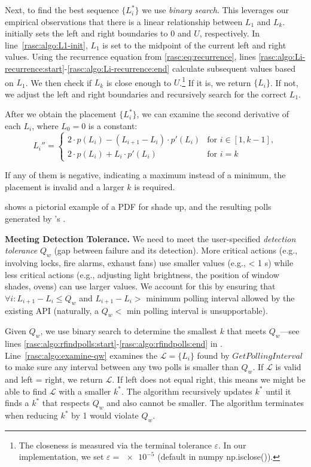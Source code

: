 Next, to find the best sequence $\{L_i^{\!*}\}$ 
we use {\it binary search}. This leverages our empirical observations that there is a linear relationship between $L_1$ and $L_k$. 
 initially sets the left and right boundaries to 0 and $U$, respectively. In line~\ref{rasc:algo:L1-init}, $L_1$ is set to the midpoint of the current left and right values. Using the recurrence equation from \eqref{rasc:eq:recurrence}, lines \ref{rasc:algo:Li-recurrence:start}-\ref{rasc:algo:Li-recurrence:end} calculate subsequent values based on $L_1$. We then check if $L_k$ is close enough to $U$.\footnote{The closeness is measured via the 
terminal tolerance $\varepsilon$. 
In our implementation, we set $\varepsilon=\num{e-5}$ (default in numpy np.isclose()).} 
If it is, we return $\{L_i\}$.  If not, we adjust the left and right boundaries and recursively search for the correct $L_1$.


After we obtain the placement $\{L_i^{\!*}\}$,
we can examine the second derivative of each $L_i$, {where $L_0=0$ is a constant}:
{\small
\[
L_i'' =
\begin{cases} 
2 \cdot p(L_i) - (L_{i+1} - L_i) \cdot p'(L_i) & \text{for } i \in [1,k-1], \\
2 \cdot p(L_i) + L_i \cdot p'(L_i) & \text{for } i=k
\end{cases} \tag{4}
\]
}

\noindent If any of them is negative, indicating a maximum instead of a minimum, the placement is invalid {and a larger $k$ is required}. 

{ shows a pictorial example of a PDF for shade up, and the resulting polls generated by \sysname's .}

\noindent \textbf{Meeting Detection Tolerance.} 
We need to meet the user-specified {\it detection tolerance} $Q_w$ (gap between failure and its detection).   
More critical actions (e.g., involving locks, fire alarms, exhaust fans) use smaller values (e.g., < 1 s) while less critical actions (e.g., adjusting light brightness, the position of window shades, ovens) can use larger values.
We account for this by ensuring that $\forall i: L_{i+1} - L_i \leq Q_w$ {and $L_{i+1} - L_i >$ minimum polling interval allowed by the existing API (naturally, a $Q_w < $ min polling interval is unsupportable).}

Given $Q_w$, we use binary search to determine the smallest $k$ that meets $Q_w$---see  lines \ref{rasc:algo:rfindpolls:start}-\ref{rasc:algo:rfindpolls:end} in . Line~\ref{rasc:algo:examine-qw} examines the $\mathcal{L}=\{L_i\}$ found by $GetPollingInterval$ to make sure any interval between any two polls is smaller than $Q_w$. If $\mathcal{L}$ is valid and left = right, we return  $\mathcal{L}$. If 
left does not equal right, this means we might be able to find  $\mathcal{L}$ 
with a smaller $k^*$. The algorithm recursively updates $k^*$ until it finds a $k^*$ that respects $Q_w$ and also cannot be smaller. The algorithm terminates when reducing $k^{*}$ by 1 would violate  $Q_w$.

